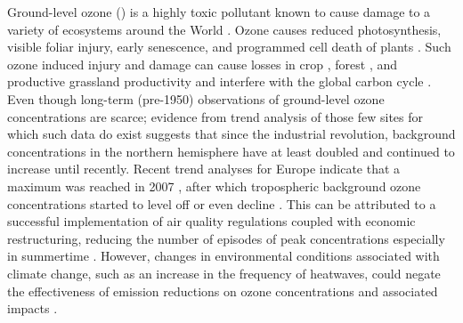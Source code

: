 \documentclass[bg, manuscript]{copernicus}
\begin{document}
\newpage


\introduction  %
\label{sec:intro}

Ground-level ozone () is a highly toxic pollutant known to cause damage to a variety of ecosystems around the World \citep{PT:Emberson2020}. Ozone causes reduced photosynthesis, visible foliar injury, early senescence, and programmed cell death of plants \citep{PCE:Kangasjarvi2005}. Such ozone induced injury and damage can cause losses in crop \citep{PJ:Ainsworth2017}, forest \citep{GCB:Wittig2009,EP:Matyssek2012}, and productive grassland productivity and interfere with the global carbon cycle \citep{BGS:Lombardozzi2013}. Even though long-term (pre-1950) observations of ground-level ozone concentrations are scarce; evidence from trend analysis of those few sites for which such data do exist suggests that since the industrial revolution, background concentrations in the northern hemisphere have at least doubled and continued to increase \citep{IPCC2013} until recently. Recent trend analyses for Europe indicate that a maximum was reached in 2007 \citep{AE:Derwent2018}, after which tropospheric background ozone concentrations started to level off or even decline \citep{ESA:Cooper2014, ACP:Wespes2018,ESA:Gaudel2018}. This can be attributed to a successful implementation of air quality regulations coupled with economic restructuring, reducing the number of episodes of peak concentrations especially in summertime \citep[e.g.,][]{ESA:Fleming2018, ESA:Mills2018}. However, changes in environmental conditions associated with climate change, such as an increase in the frequency of heatwaves, could negate the effectiveness of emission reductions on ozone concentrations and associated impacts \citep{NCC:Lin2020}. 
\end{document}

